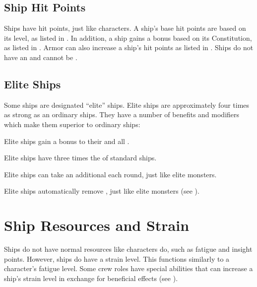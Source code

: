   \subsection{Ship Hit Points}
    Ships have hit points, just like characters.
    A ship's base hit points are based on its level, as listed in .
    In addition, a ship gains a bonus based on its Constitution, as listed in .
    Armor can also increase a ship's hit points as listed in .
    Ships do not have an  and cannot be .

  \subsection{Elite Ships}\label{Elite Ships}
    Some ships are designated ``elite'' ships.
    Elite ships are approximately four times as strong as an ordinary ships.
    They have a number of benefits and modifiers which make them superior to ordinary ships:
    \begin{raggeditemize}
      \item Elite ships gain a  bonus to their  and all .
      \item Elite ships have three times the  of standard ships.
      \item Elite ships can take an additional  each round, just like elite monsters.
      \item Elite ships automatically remove , just like elite monsters (see ).
    \end{raggeditemize}

\section{Ship Resources and Strain}
  Ships do not have normal resources like characters do, such as fatigue and insight points.
  However, ships do have a strain level.
  This functions similarly to a character's fatigue level.
  Some crew roles have special abilities that can increase a ship's strain level in exchange for beneficial effects (see ).

